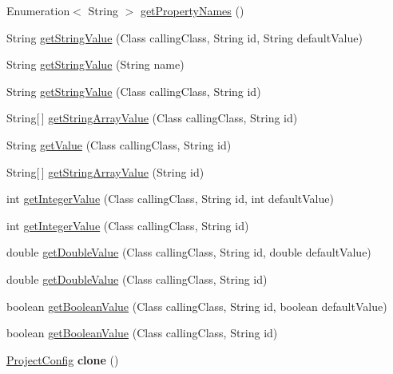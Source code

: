 \begin{DoxyCompactItemize}
\item 
Enumeration$<$ String $>$ \hyperlink{classorg_1_1contikios_1_1cooja_1_1ProjectConfig_a8e954d4b40a4af51f7851a15dd356433}{get\-Property\-Names} ()
\item 
String \hyperlink{classorg_1_1contikios_1_1cooja_1_1ProjectConfig_a21a33e307cb7b51bcd2a22cd42f20711}{get\-String\-Value} (Class calling\-Class, String id, String default\-Value)
\item 
String \hyperlink{classorg_1_1contikios_1_1cooja_1_1ProjectConfig_a9b1a075adc98af163212eb03bb1899f8}{get\-String\-Value} (String name)
\item 
String \hyperlink{classorg_1_1contikios_1_1cooja_1_1ProjectConfig_a2d9ca209d31b4a93348d4555551f49b5}{get\-String\-Value} (Class calling\-Class, String id)
\item 
String\mbox{[}$\,$\mbox{]} \hyperlink{classorg_1_1contikios_1_1cooja_1_1ProjectConfig_a240e81c9e486a5241a24ec65b4d7a772}{get\-String\-Array\-Value} (Class calling\-Class, String id)
\item 
String \hyperlink{classorg_1_1contikios_1_1cooja_1_1ProjectConfig_a9c23964b996ab25e6b4e24be5d19a6df}{get\-Value} (Class calling\-Class, String id)
\item 
String\mbox{[}$\,$\mbox{]} \hyperlink{classorg_1_1contikios_1_1cooja_1_1ProjectConfig_a022a7927422996695761bd39b7400ffc}{get\-String\-Array\-Value} (String id)
\item 
int \hyperlink{classorg_1_1contikios_1_1cooja_1_1ProjectConfig_aa63aa3e97f184949eff1ed1322cc9106}{get\-Integer\-Value} (Class calling\-Class, String id, int default\-Value)
\item 
int \hyperlink{classorg_1_1contikios_1_1cooja_1_1ProjectConfig_a326c53ca9296be299c9059bfba09c807}{get\-Integer\-Value} (Class calling\-Class, String id)
\item 
double \hyperlink{classorg_1_1contikios_1_1cooja_1_1ProjectConfig_ac0c4d039461006a06fcd743b3ee9fc6e}{get\-Double\-Value} (Class calling\-Class, String id, double default\-Value)
\item 
double \hyperlink{classorg_1_1contikios_1_1cooja_1_1ProjectConfig_a12f5d1275491768e18464c10d380f791}{get\-Double\-Value} (Class calling\-Class, String id)
\item 
boolean \hyperlink{classorg_1_1contikios_1_1cooja_1_1ProjectConfig_a457c86b3b4642729ede9e14bb850d043}{get\-Boolean\-Value} (Class calling\-Class, String id, boolean default\-Value)
\item 
boolean \hyperlink{classorg_1_1contikios_1_1cooja_1_1ProjectConfig_a9ab9cadecc9bbe636b11180a871cef11}{get\-Boolean\-Value} (Class calling\-Class, String id)
\item 
\hypertarget{classorg_1_1contikios_1_1cooja_1_1ProjectConfig_acd006795c65f6283916b6c94d8f42e06}{\hyperlink{classorg_1_1contikios_1_1cooja_1_1ProjectConfig}{Project\-Config} {\bfseries clone} ()}\label{classorg_1_1contikios_1_1cooja_1_1ProjectConfig_acd006795c65f6283916b6c94d8f42e06}

\end{DoxyCompactItemize}


